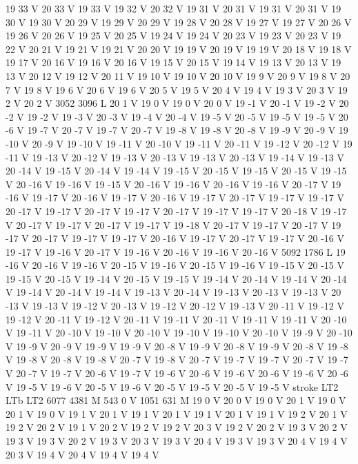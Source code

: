 {{19 33 V
20 33 V
19 33 V
19 32 V
20 32 V
19 31 V
20 31 V
19 31 V
20 31 V
19 30 V
19 30 V
20 29 V
19 29 V
20 29 V
19 28 V
20 28 V
19 27 V
19 27 V
20 26 V
19 26 V
20 26 V
19 25 V
20 25 V
19 24 V
19 24 V
20 23 V
19 23 V
20 23 V
19 22 V
20 21 V
19 21 V
19 21 V
20 20 V
19 19 V
20 19 V
19 19 V
20 18 V
19 18 V
19 17 V
20 16 V
19 16 V
20 16 V
19 15 V
20 15 V
19 14 V
19 13 V
20 13 V
19 13 V
20 12 V
19 12 V
20 11 V
19 10 V
19 10 V
20 10 V
19 9 V
20 9 V
19 8 V
20 7 V
19 8 V
19 6 V
20 6 V
19 6 V
20 5 V
19 5 V
20 4 V
19 4 V
19 3 V
20 3 V
19 2 V
20 2 V
3052 3096 L
20 1 V
19 0 V
19 0 V
20 0 V
19 -1 V
20 -1 V
19 -2 V
20 -2 V
19 -2 V
19 -3 V
20 -3 V
19 -4 V
20 -4 V
19 -5 V
20 -5 V
19 -5 V
19 -5 V
20 -6 V
19 -7 V
20 -7 V
19 -7 V
20 -7 V
19 -8 V
19 -8 V
20 -8 V
19 -9 V
20 -9 V
19 -10 V
20 -9 V
19 -10 V
19 -11 V
20 -10 V
19 -11 V
20 -11 V
19 -12 V
20 -12 V
19 -11 V
19 -13 V
20 -12 V
19 -13 V
20 -13 V
19 -13 V
20 -13 V
19 -14 V
19 -13 V
20 -14 V
19 -15 V
20 -14 V
19 -14 V
19 -15 V
20 -15 V
19 -15 V
20 -15 V
19 -15 V
20 -16 V
19 -16 V
19 -15 V
20 -16 V
19 -16 V
20 -16 V
19 -16 V
20 -17 V
19 -16 V
19 -17 V
20 -16 V
19 -17 V
20 -16 V
19 -17 V
20 -17 V
19 -17 V
19 -17 V
20 -17 V
19 -17 V
20 -17 V
19 -17 V
20 -17 V
19 -17 V
19 -17 V
20 -18 V
19 -17 V
20 -17 V
19 -17 V
20 -17 V
19 -17 V
19 -18 V
20 -17 V
19 -17 V
20 -17 V
19 -17 V
20 -17 V
19 -17 V
19 -17 V
20 -16 V
19 -17 V
20 -17 V
19 -17 V
20 -16 V
19 -17 V
19 -16 V
20 -17 V
19 -16 V
20 -16 V
19 -16 V
20 -16 V
5092 1786 L
19 -16 V
20 -16 V
19 -16 V
20 -15 V
19 -16 V
20 -15 V
19 -16 V
19 -15 V
20 -15 V
19 -15 V
20 -15 V
19 -14 V
20 -15 V
19 -15 V
19 -14 V
20 -14 V
19 -14 V
20 -14 V
19 -14 V
20 -14 V
19 -14 V
19 -13 V
20 -14 V
19 -13 V
20 -13 V
19 -13 V
20 -13 V
19 -13 V
19 -12 V
20 -13 V
19 -12 V
20 -12 V
19 -13 V
20 -11 V
19 -12 V
19 -12 V
20 -11 V
19 -12 V
20 -11 V
19 -11 V
20 -11 V
19 -11 V
19 -11 V
20 -10 V
19 -11 V
20 -10 V
19 -10 V
20 -10 V
19 -10 V
19 -10 V
20 -10 V
19 -9 V
20 -10 V
19 -9 V
20 -9 V
19 -9 V
19 -9 V
20 -8 V
19 -9 V
20 -8 V
19 -9 V
20 -8 V
19 -8 V
19 -8 V
20 -8 V
19 -8 V
20 -7 V
19 -8 V
20 -7 V
19 -7 V
19 -7 V
20 -7 V
19 -7 V
20 -7 V
19 -7 V
20 -6 V
19 -7 V
19 -6 V
20 -6 V
19 -6 V
20 -6 V
19 -6 V
20 -6 V
19 -5 V
19 -6 V
20 -5 V
19 -6 V
20 -5 V
19 -5 V
20 -5 V
19 -5 V
stroke
LT2
LTb
LT2
6077 4381 M
543 0 V
1051 631 M
19 0 V
20 0 V
19 0 V
20 1 V
19 0 V
20 1 V
19 0 V
19 1 V
20 1 V
19 1 V
20 1 V
19 1 V
20 1 V
19 1 V
19 2 V
20 1 V
19 2 V
20 2 V
19 1 V
20 2 V
19 2 V
19 2 V
20 3 V
19 2 V
20 2 V
19 3 V
20 2 V
19 3 V
19 3 V
20 2 V
19 3 V
20 3 V
19 3 V
20 4 V
19 3 V
19 3 V
20 4 V
19 4 V
20 3 V
19 4 V
20 4 V
19 4 V
19 4 V
}}
